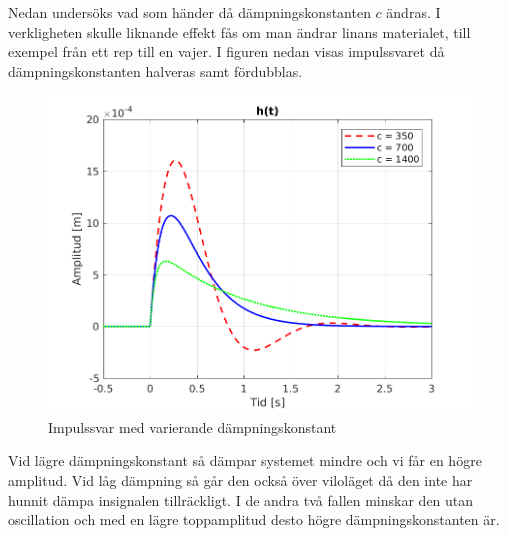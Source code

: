 \newpage
Nedan undersöks vad som händer då dämpningskonstanten $c$ ändras. I verkligheten skulle liknande effekt fås om man ändrar linans materialet, till exempel från ett rep till en vajer.
I figuren nedan visas impulssvaret då dämpningskonstanten halveras samt fördubblas.
\begin{figure}[H]
    \centering
    \includegraphics[scale=0.9]{bilder/impulssvar_variation_c}
    \caption{Impulssvar med varierande dämpningskonstant}
    \label{fig:impulssvar_variation_c}
\end{figure}
Vid lägre dämpningskonstant så dämpar systemet mindre och vi får en högre amplitud. Vid låg dämpning så går den också över viloläget då den inte har hunnit dämpa insignalen tillräckligt. I de andra två fallen minskar den utan oscillation och med en lägre toppamplitud desto högre dämpningskonstanten är.

\newpage
